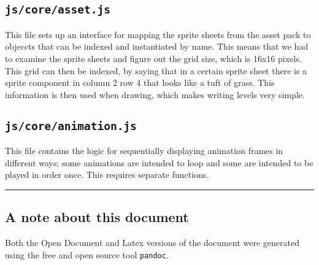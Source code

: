 \documentclass[11pt]{article}
\begin{document}
\subsection{\texttt{js/core/asset.js}}
\label{sec:orgde09f3c}
This file sets up an interface for mapping the sprite sheets from the asset pack to objeccts that can be indexed and instantiated by name. This means that we had to examine the sprite sheets and figure out the grid size, which is 16x16 pixels. This grid can then be indexed, by saying that in a certain sprite sheet there is a sprite component in column 2 row 4 that looks like a tuft of grass. This information is then used when drawing, which makes writing levels very simple.\\
\subsection{\texttt{js/core/animation.js}}
\label{sec:org15187d0}
This file contains the logic for sequentially displaying animation frames in different ways; some animations are intended to loop and some are intended to be played in order once. This requires separate functions.\\

\noindent\rule{\textwidth}{0.5pt}
\subsection{A note about this document}
\label{sec:orgd5ae72d}
Both the Open Document and Latex versions of the document were generated using the free and open source tool \texttt{pandoc}.\\
\end{document}
